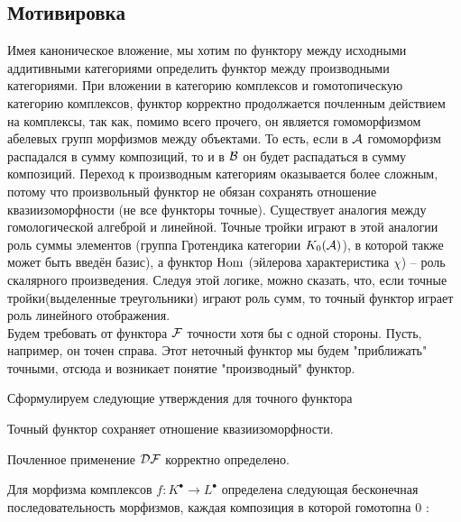 \documentclass[../main.tex]{subfiles}
\begin{document}
\subsection{Мотивировка}
Имея каноническое вложение, мы хотим по функтору между исходными аддитивными категориями определить функтор между производными категориями. При вложении в категорию комплексов и гомотопическую категорию комплексов, функтор корректно продолжается почленным действием на комплексы, так как, помимо всего прочего, он является гомоморфизмом абелевых групп морфизмов между объектами. То есть, если в $\mathcal{A}$ гомоморфизм распадался в сумму композиций, то и в $\mathcal{B}$ он будет распадаться в сумму композиций. Переход к производным категориям оказывается более сложным, потому что произвольный функтор не обязан сохранять отношение квазиизоморфности (не все функторы точные). Существует аналогия между гомологической алгеброй и линейной. Точные тройки играют в этой аналогии роль суммы элементов (группа Гротендика категории $K_0(\mathcal{A})$), в которой также может быть введён базис), а функтор $\operatorname{Hom}$ (эйлерова характеристика $\chi$) -- роль скалярного произведения. Следуя этой логике, можно сказать, что, если точные тройки(выделенные треугольники) играют роль сумм, то точный функтор играет роль линейного отображения.\\
Будем требовать от функтора $\mathcal{F}$ точности хотя бы с одной стороны. Пусть, например, он точен справа. Этот неточный функтор мы будем "приближать" точными, отсюда и возникает понятие "производный" функтор.
\bee
\eee
Сформулируем следующие утверждения для точного функтора 
\begin{to_claim}
 Точный функтор сохраняет отношение квазиизоморфности. 
\end{to_claim}
\begin{to_claim}
 Почленное применение $\mathcal{D F}$ корректно определено. 
\end{to_claim}
\begin{to_com}
    Для морфизма комплексов $f\colon K^\bullet\to L^\bullet$ определена следующая бесконечная последовательность морфизмов, каждая композиция в которой гомотопна 0 : 
    \bee {}\eee
\end{to_com}
\end{document}
